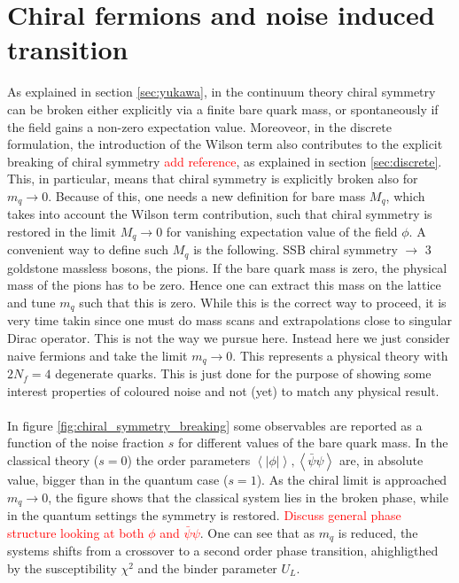 \newpage
\section{Chiral fermions and noise induced transition}
\label{sec:chiral}

As explained in section \ref{sec:yukawa}, in the continuum theory chiral symmetry can be broken either explicitly via a finite bare quark mass, or spontaneously if the field gains a non-zero expectation value. Moreoveor, in the discrete formulation, the introduction of the Wilson term also contributes to the explicit breaking of chiral symmetry \textcolor{red}{add reference}, as explained in section \ref{sec:discrete}. This, in particular, means that chiral symmetry is explicitly broken also for $m_q \to 0$. Because of this, one needs a new definition for bare mass $M_q$, which takes into account the Wilson term contribution, such that chiral symmetry is restored in the limit $M_q \to 0$ for vanishing expectation value of the field $\phi$. A convenient way to define such $M_q$ is the following. SSB chiral symmetry $\to$ 3 goldstone massless bosons, the pions. If the bare quark mass is zero, the physical mass of the pions has to be zero. Hence one can extract this mass on the lattice and tune $m_q$ such that this is zero. While this is the correct way to proceed, it is very time takin since one must do mass scans and extrapolations close to singular Dirac operator. This is not the way we pursue here. Instead here we just consider naive fermions and take the limit $m_q \to 0$. This represents a physical theory with $2N_f = 4$ degenerate quarks. This is just done for the purpose of showing some interest properties of coloured noise and not (yet) to match any physical result. \\~\\
In figure \ref{fig:chiral_symmetry_breaking} some observables are reported as a function of the noise fraction $s$ for different values of the bare quark mass. In the classical theory ($s=0$) the order parameters $\left\langle|\phi|\right\rangle, \left\langle\bar\psi \psi\right\rangle$ are, in absolute value, bigger than in the quantum case ($s=1$).  As the chiral limit is approached $m_q \to 0$, the figure shows that the classical system lies in the broken phase, while in the quantum settings the symmetry is restored. \textcolor{red}{Discuss general phase structure looking at both $\phi$ and $\bar\psi\psi$}. One can see that as $m_q$ is reduced, the systems shifts from a crossover to a second order phase transition, ahighligthed by the susceptibility $\chi^2$ and the binder parameter $U_L$.

